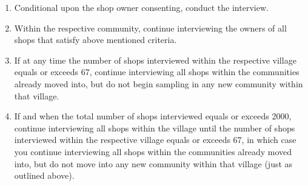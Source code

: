 \documentclass[11.5pt]{article}
\begin{document}
{\begin{appendices}
\begin{enumerate}
\begin{enumerate}
		\item The shop is at a distance of at least 30 meters to any other shop 					already listed.

		\item The shop is not a mere handcart or not otherwise easily moved.

		\item The shop is at least 4 $m^2$ in size

		\item The shop offers products from at least 2 product categories out of 					the following list:

		\begin{enumerate}


			\item Perishables (vegetables, fruits, eggs, rice, etc.)
			\item Pre-packaged food
			\item Soft-drinks and packaged drinks
			\item Snacks
			\item Tobacco
			\item Medicine
			\item Cleaning products
			\item Personal care
			\item DIY products

		\end{enumerate}

		\item The shop owner professes an aspiration to grow their business.

	\end{enumerate}

	\item Conditional upon the shop owner consenting, conduct the interview.

	\item Within the respective community, continue interviewing the owners of all 				shops that satisfy above mentioned criteria.

	\item If at any time the number of shops interviewed within the respective 					village equals or exceeds 67, continue interviewing all shops within 				the communities already moved into, but do not begin sampling in any 				new community within that village.

	\item If and when the total number of shops interviewed equals or exceeds 					2000, continue interviewing all shops within the village until the 					number of shops interviewed within the respective village equals or 				exceeds 67, in which case you continue interviewing all shops within 				the communities already moved into, but do not move into any new 					community within that village (just as outlined above).


\end{enumerate}
\end{appendices}}
\end{document}

